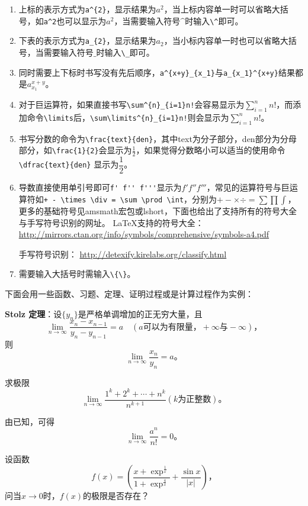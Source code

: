 \begin{enumerate}[1.]
\item 上标的表示方式为\verb|a^{2}|，显示结果为$a^{2}$，当上标内容单一时可以省略大括号，如\verb|a^2|也可以显示为$a^2$，当需要输入符号$\^$时输入\verb|\^|即可。
\item 下表的表示方式为\verb|a_{2}|，显示结果为$a_{2}$，当小标内容单一时也可以省略大括号，当需要输入符号$\_$时输入\verb|\_|即可。
\item 同时需要上下标时书写没有先后顺序，\verb|a^{x+y}_{x_1}|与\verb|a_{x_1}^{x+y}|结果都是$a_{x_1}^{x+y}$。
\item 对于巨运算符，如果直接书写\verb|\sum^{n}_{i=1}n!|会容易显示为$\sum^{n}_{i=1}n!$，而添加命令\verb|\limits|后，\verb|\sum\limits^{n}_{i=1}n!|则会显示为$\sum\limits^{n}_{i=1}n!$。
\item 书写分数的命令为\verb|\frac{text}{den}|，其中text为分子部分，den部分为分母部分，如\verb|\frac{1}{2}|会显示为$\frac{1}{2}$，如果觉得分数略小可以适当的使用命令\verb|\dfrac{text}{den}|
显示为$\dfrac{1}{2}$。
\item 导数直接使用单引号即可\verb|f' f'' f'''|显示为$f' f'' f'''$，常见的运算符号与巨运算符如\verb|+ - \times \div = \sum \prod \int|，分别为$+ - \times \div = \sum \prod \int$，更多的基础符号见amsmath宏包或lshort，下面也给出了支持所有的符号大全与手写符号识别的网址。
\LaTeX 支持的符号大全：
\url{http://mirrors.ctan.org/info/symbols/comprehensive/symbols-a4.pdf}

手写符号识别：
\url{http://detexify.kirelabs.org/classify.html}
\item 需要输入大括号时需输入\verb|\{\}|。
\end{enumerate}
下面会用一些函数、习题、定理、证明过程或是计算过程作为实例：

\textbf{Stolz 定理}：设$\{y_n\}$是严格单调增加的正无穷大量，且
\[
\lim\limits_{n \to \infty}\frac{x_n-x_{n-1}}{y_n-y_{n-1}}=a\quad (a\text{可以为有限量，}+\infty\text{与}-\infty)\text{，}
\]
则
\[
\lim\limits_{n \to \infty}\frac{x_n}{y_n}=a\text{。}
\]

求极限
\[
\lim\limits_{n \to \infty}\frac{1^k+2^k+\cdots+n^k}{n^{k+1}}(k\text{为正整数})\text{。}
\]

由已知，可得
\begin{equation}\label{equ1}
\lim\limits_{n \to \infty}\frac{a^n}{n!}=0\text{。}
\end{equation}

设函数
\[
f(x)=(\frac{x+\exp^{\frac{1}{x}}}{1+\exp^{\frac{4}{x}}}+\frac{\sin x}{|x|})\text{，}
\]
问当$x\to 0$时，$f(x)$的极限是否存在？

